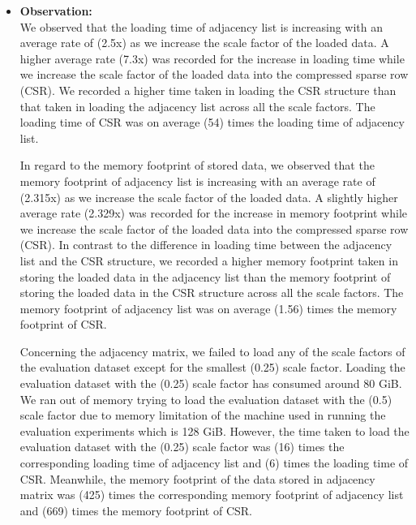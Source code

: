 {\begin{itemize}
In regard to the memory footprint, we expect the memory footprint of adjacency matrix to be a lot bigger than the memory footprint of the adjacency list and the compressed sparse row (CSR). We expect the memory footprint of CSR to be smaller than that of adjacency list.

\item \textbf{Observation:}\\   
We observed that the loading time of adjacency list is increasing with an average rate of (2.5x) as we increase the scale factor of the loaded data. A higher average rate (7.3x) was recorded for the increase in loading time while we increase the scale factor of the loaded data into the compressed sparse row (CSR). We recorded a higher time taken in loading the CSR structure than that taken in loading the adjacency list across all the scale factors. The loading time of CSR was on average (54) times the loading time of adjacency list.

In regard to the memory footprint of stored data, we observed that the memory footprint of adjacency list is increasing with an average rate of (2.315x) as we increase the scale factor of the loaded data. A slightly higher average rate (2.329x) was recorded for the increase in memory footprint while we increase the scale factor of the loaded data into the compressed sparse row (CSR). In contrast to the difference in loading time between the adjacency list and the CSR structure, we recorded a higher memory footprint taken in storing the loaded data in the adjacency list than the memory footprint of storing the loaded data in the CSR structure across all the scale factors. The memory footprint of adjacency list was on average (1.56) times the memory footprint of CSR.

Concerning the adjacency matrix, we failed to load any of the scale factors of the evaluation dataset except for the smallest (0.25) scale factor. Loading the evaluation dataset with the (0.25) scale factor has consumed around 80 GiB. We ran out of memory trying to load the evaluation dataset with the (0.5) scale factor due to memory limitation of the machine used in running the evaluation experiments which is 128 GiB. However, the time taken to load the evaluation dataset with the (0.25) scale factor was (16) times the corresponding loading time of adjacency list and (6) times the loading time of CSR. Meanwhile, the memory footprint of the data stored in adjacency matrix was (425) times the corresponding memory footprint of adjacency list and (669) times the memory footprint of CSR.


\end{itemize}}
